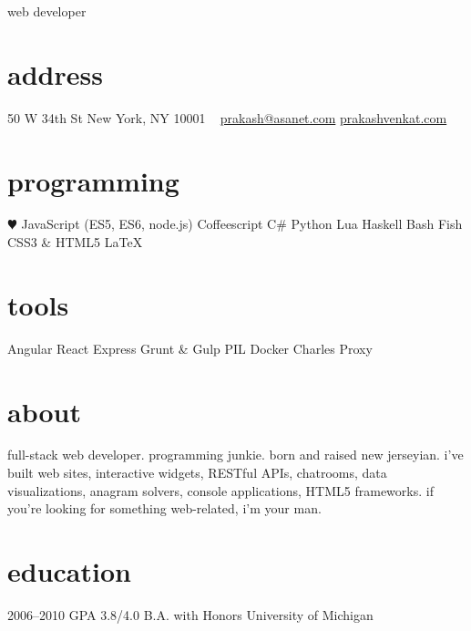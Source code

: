 \documentclass[]{friggeri-cv}
\begin{document}
       {web developer}


\begin{aside}
  \section{address}
    50 W 34th St
    New York, NY 10001
    ~
    \href{mailto:prakash@asanet.com}{prakash@asanet.com}
    \href{http://prakashvenkat.com}{prakashvenkat.com}
  \section{programming}
    {\color{red} $\varheartsuit$} JavaScript
    (ES5, ES6, node.js)
    Coffeescript
    C\#
    Python
    Lua
    Haskell
    Bash
    Fish
    CSS3 \& HTML5
    LaTeX
  \section{tools}
    Angular
    React
    Express
    Grunt \& Gulp
    PIL
    Docker
    Charles Proxy
\end{aside}

\section{about}
full-stack web developer. programming junkie. born and raised new jerseyian. i've built web sites, interactive widgets,
RESTful APIs, chatrooms, data visualizations, anagram solvers, console applications, 
HTML5 frameworks. if you're looking for something web-related, i'm your man.

\section{education}

\begin{entrylist}
  \entry
    {2006–2010}
    {GPA 3.8/4.0}
    {B.A. with Honors}
    {University of Michigan}
\end{entrylist}
\end{document}
